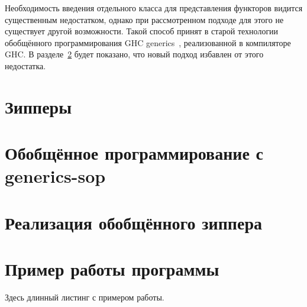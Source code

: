 Необходимость введения отдельного класса для представления
функторов видится существенным недостатком, однако при
рассмотренном подходе для этого не существует другой возможности.
Такой способ принят в старой технологии обобщённого
программирования \textsf{GHC generics}~\cite{ghc-generics},
реализованной в компиляторе \textsf{GHC}. В
разделе~\ref{sec:generics-sop} будет показано, что новый подход
избавлен от этого недостатка.

\section{Зипперы}
\label{sec:zippers}

\section{Обобщённое программирование с \textsf{generics-sop}}
\label{sec:generics-sop}

\section{Реализация обобщённого зиппера}
\label{sec:generic-zippers-sop}

\printbibliography[heading=bibintoc%
]

\appendix
{}

\section{Пример работы программы}

Здесь длинный листинг с примером работы.


